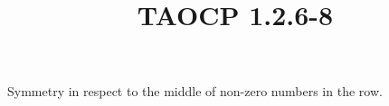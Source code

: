 \documentclass{article}
\title{TAOCP 1.2.6\mbox{-}8}
\begin{document}
\maketitle

Symmetry in respect to the middle of non-zero numbers in the row.
\end{document}
